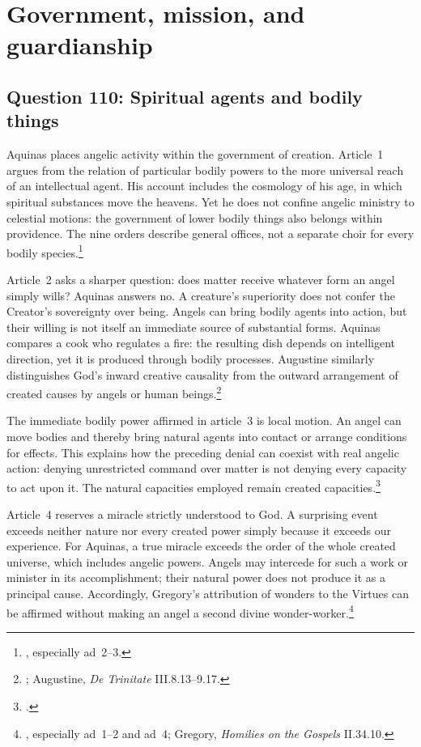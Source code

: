 \section{Government, mission, and guardianship}

\subsection{Question 110: Spiritual agents and bodily things}\label{q110}
Aquinas places angelic activity within the government of creation. Article~1 argues from the relation of particular bodily powers to the more universal reach of an intellectual agent. His account includes the cosmology of his age, in which spiritual substances move the heavens. Yet he does not confine angelic ministry to celestial motions: the government of lower bodily things also belongs within providence. The nine orders describe general offices, not a separate choir for every bodily species.\footnote{, especially ad~2--3.}

Article~2 asks a sharper question: does matter receive whatever form an angel simply wills? Aquinas answers no. A creature's superiority does not confer the Creator's sovereignty over being. Angels can bring bodily agents into action, but their willing is not itself an immediate source of substantial forms. Aquinas compares a cook who regulates a fire: the resulting dish depends on intelligent direction, yet it is produced through bodily processes. Augustine similarly distinguishes God's inward creative causality from the outward arrangement of created causes by angels or human beings.\footnote{; Augustine, \emph{De Trinitate} III.8.13--9.17.}

The immediate bodily power affirmed in article~3 is local motion. An angel can move bodies and thereby bring natural agents into contact or arrange conditions for effects. This explains how the preceding denial can coexist with real angelic action: denying unrestricted command over matter is not denying every capacity to act upon it. The natural capacities employed remain created capacities.\footnote{.}

Article~4 reserves a miracle strictly understood to God. A surprising event exceeds neither nature nor every created power simply because it exceeds our experience. For Aquinas, a true miracle exceeds the order of the whole created universe, which includes angelic powers. Angels may intercede for such a work or minister in its accomplishment; their natural power does not produce it as a principal cause. Accordingly, Gregory's attribution of wonders to the Virtues can be affirmed without making an angel a second divine wonder-worker.\footnote{, especially ad~1--2 and ad~4; Gregory, \emph{Homilies on the Gospels} II.34.10.}

